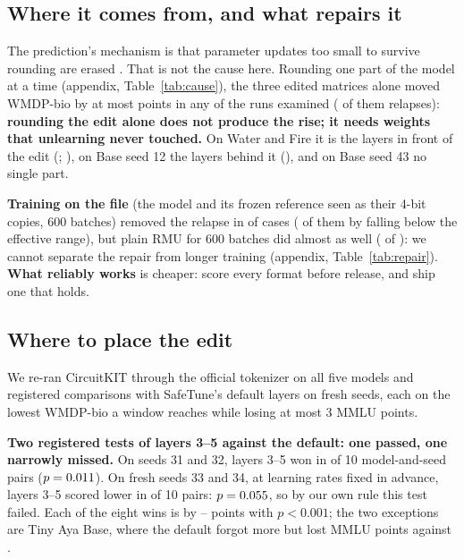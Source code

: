 \documentclass[11pt]{article}
\newcommand{\wmdp}{WMDP-bio}
\begin{document}
\subsection{Where it comes from, and what repairs it}
\label{sec:repair}

The prediction's mechanism is that parameter updates too small to survive rounding are erased \citep{zhang2025quantization,sadhu2026forgetting}. That is not the cause here. Rounding one part of the model at a time (appendix, Table~\ref{tab:cause}), the three edited matrices alone moved \wmdp{} by at most \causeEditedMax{} points in any of the \causeCases{} runs examined (\causeRelapses{} of them relapses): \textbf{rounding the edit alone does not produce the rise; it needs weights that unlearning never touched.} On Water and Fire it is the layers in front of the edit (\causeWater{}; \causeFire{}), on Base seed 12 the layers behind it (\causeBaseA{}), and on Base seed 43 no single part.

\textbf{Training on the file} (the model and its frozen reference seen as their 4-bit copies, 600 batches) removed the relapse in \repA{} of \repN{} cases (\repBelow{} of them by falling below the effective range), but plain RMU for 600 batches did almost as well (\ctlA{} of \ctlN): we cannot separate the repair from longer training (appendix, Table~\ref{tab:repair}). \textbf{What reliably works} is cheaper: score every format before release, and ship one that holds.



\subsection{Where to place the edit}
\label{sec:place}

We re-ran CircuitKIT through the official tokenizer on all five models and registered comparisons with SafeTune's default layers on fresh seeds, each on the lowest \wmdp{} a window reaches while losing at most 3 MMLU points.

\textbf{Two registered tests of layers 3--5 against the default: one passed, one narrowly missed.} On seeds 31 and 32, layers 3--5 won in \placeQTwoWins{} of 10 model-and-seed pairs ($p=0.011$). On fresh seeds 33 and 34, at learning rates fixed in advance, layers 3--5 scored lower in \finalWins{} of 10 pairs: $p=0.055$, so by our own rule this test failed. Each of the eight wins is by \finalGainLow--\finalGainHigh{} points with $p<0.001$; the two exceptions are Tiny Aya Base, where the default forgot more but lost \finalBaseCostOld{} MMLU points against \finalBaseCostNew.
\end{document}
